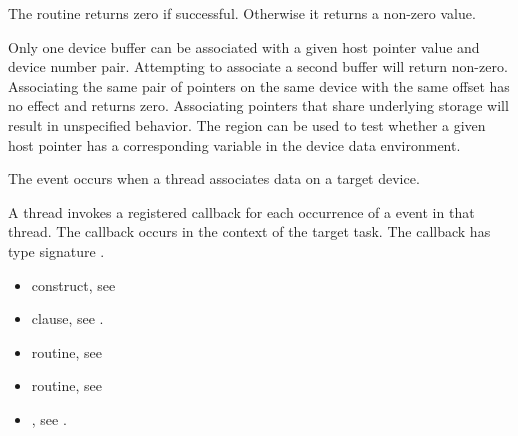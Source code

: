 \begin{ccppspecific}
The routine returns zero if successful. Otherwise it returns a non-zero value.

Only one device buffer can be associated with a given host pointer value and
device number pair. Attempting to associate a second buffer will return
non-zero. Associating the same pair of pointers on the same device with the
same offset has no effect and returns zero.  Associating pointers that share
underlying storage will result in unspecified behavior. The
 region can be used to test whether a given
host pointer has a corresponding variable in the device data environment.

\events
The  event occurs when a thread associates data on a target device.

\begin{figure}[t!]
\end{figure}

\tools

A thread invokes a registered 
callback for each occurrence of a  event in that thread. 
The callback occurs in the context of the target task.  The callback has type signature
. 

\crossreferences
\begin{itemize}
\item {} construct, see 

\item {} clause, see .

\item {} routine, see 

\item {} routine, see 

\item {}, see 
.

\end{itemize}

\subsection{}
\label{subsec:omp_target_disassociate_ptr}
\summary


\end{ccppspecific}
